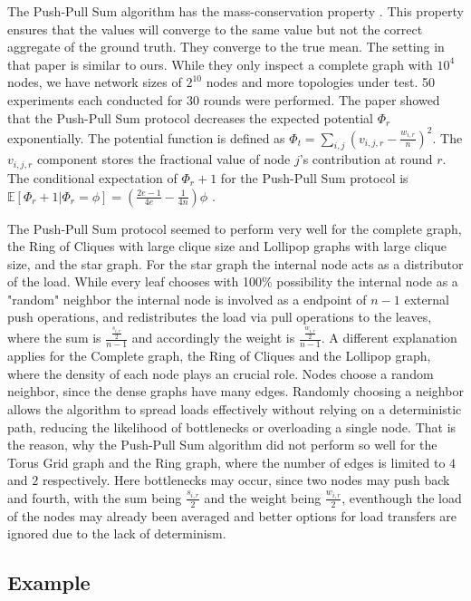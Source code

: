 

The Push-Pull Sum algorithm has the mass-conservation property \cite{nugroho2023PushPullSumDataAg}. This property ensures that the values will converge to the same value but not the correct aggregate of the ground truth. They converge to the true mean. The setting in that paper is similar to ours. While they only inspect a complete graph with $10^{4}$ nodes, we have network sizes of $2^{10}$ nodes and more topologies under test. 50 experiments each conducted for 30 rounds were performed. The paper showed that the Push-Pull Sum protocol decreases the expected potential $\Phi_r$ exponentially. The potential function is defined as $\Phi_t=\sum_{i,j}\left(v_{i,j,r}-\frac{w_{i,r}}{n}\right)^{2}$. The $v_{i,j,r}$ component stores the fractional value of node $j$'s contribution at round $r$. The conditional expectation of $\Phi_r+1$ for the Push-Pull Sum protocol is $\mathbb{E}[\Phi_r+1|\Phi_r=\phi]=(\frac{2e-1}{4e}-\frac{1}{4n})\phi$ \cite{nugroho2023PushPullSumDataAg}.

The Push-Pull Sum protocol seemed to perform very well for the complete graph, the Ring of Cliques with large clique size and Lollipop graphs with large clique size, and the star graph. For the star graph the internal node acts as a distributor of the load. While every leaf chooses with 100\% possibility the internal node as a "random" neighbor the internal node is involved as a endpoint of $n-1$ external push operations, and redistributes the load via pull operations to the leaves, where the sum is $\frac{\frac{s_{i,r}}{2}}{n-1}$ and accordingly the weight is $\frac{\frac{w_{i,r}}{2}}{n-1}$. A different explanation applies for the Complete graph, the Ring of Cliques and the Lollipop graph, where the density of each node plays an crucial role. Nodes choose a random neighbor, since the dense graphs have many edges. Randomly choosing a neighbor allows the algorithm to spread loads effectively without relying on a deterministic path, reducing the likelihood of bottlenecks or overloading a single node. That is the reason, why the Push-Pull Sum algorithm did not perform so well for the Torus Grid graph and the Ring graph, where the number of edges is limited to $4$ and $2$ respectively. Here bottlenecks may occur, since two nodes may push back and fourth, with the sum being $\frac{s_{i,r}}{2}$ and the weight being $\frac{w_{i,r}}{2}$, eventhough the load of the nodes may already been averaged and better options for load transfers are ignored due to the lack of determinism.
\subsection{Example}\label{subsec:examplePPS}
\begin{center}
    
\end{center}
\begin{center}
    
\end{center}

